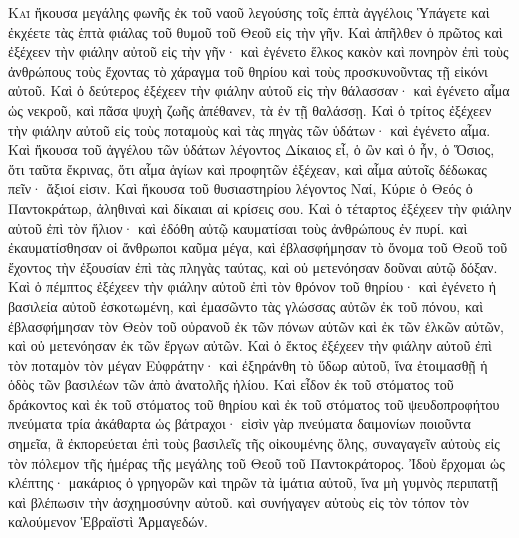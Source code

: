 \begin{pages}
    \begin{Rightside}
        \beginnumbering
		\renewcommand{\LettrineFontHook}{\PHtitl}
		\lettrine[lines=3]{Κ}{αὶ} ἤκουσα μεγάλης φωνῆς ἐκ τοῦ ναοῦ λεγούσης τοῖς ἑπτὰ ἀγγέλοις Ὑπάγετε καὶ ἐκχέετε τὰς ἑπτὰ φιάλας τοῦ θυμοῦ τοῦ Θεοῦ εἰς τὴν γῆν. Καὶ ἀπῆλθεν ὁ πρῶτος καὶ ἐξέχεεν τὴν φιάλην αὐτοῦ εἰς τὴν γῆν· καὶ ἐγένετο ἕλκος κακὸν καὶ πονηρὸν ἐπὶ τοὺς ἀνθρώπους τοὺς ἔχοντας τὸ χάραγμα τοῦ θηρίου καὶ τοὺς προσκυνοῦντας τῇ εἰκόνι αὐτοῦ. 
		\pend
		\pstart
		Καὶ ὁ δεύτερος ἐξέχεεν τὴν φιάλην αὐτοῦ εἰς τὴν θάλασσαν· καὶ ἐγένετο αἷμα ὡς νεκροῦ, καὶ πᾶσα ψυχὴ ζωῆς ἀπέθανεν, τὰ ἐν τῇ θαλάσσῃ. Καὶ ὁ τρίτος ἐξέχεεν τὴν φιάλην αὐτοῦ εἰς τοὺς ποταμοὺς καὶ τὰς πηγὰς τῶν ὑδάτων· καὶ ἐγένετο αἷμα. Καὶ ἤκουσα τοῦ ἀγγέλου τῶν ὑδάτων λέγοντος Δίκαιος εἶ, ὁ ὢν καὶ ὁ ἦν, ὁ Ὅσιος, ὅτι ταῦτα ἔκρινας, ὅτι αἷμα ἁγίων καὶ προφητῶν ἐξέχεαν, καὶ αἷμα αὐτοῖς δέδωκας πεῖν· ἄξιοί εἰσιν. 
		\pend
		\pstart
		Καὶ ἤκουσα τοῦ θυσιαστηρίου λέγοντος Ναί, Κύριε ὁ Θεός ὁ Παντοκράτωρ, ἀληθιναὶ καὶ δίκαιαι αἱ κρίσεις σου. Καὶ ὁ τέταρτος ἐξέχεεν τὴν φιάλην αὐτοῦ ἐπὶ τὸν ἥλιον· καὶ ἐδόθη αὐτῷ καυματίσαι τοὺς ἀνθρώπους ἐν πυρί. καὶ ἐκαυματίσθησαν οἱ ἄνθρωποι καῦμα μέγα, καὶ ἐβλασφήμησαν τὸ ὄνομα τοῦ Θεοῦ τοῦ ἔχοντος τὴν ἐξουσίαν ἐπὶ τὰς πληγὰς ταύτας, καὶ οὐ μετενόησαν δοῦναι αὐτῷ δόξαν. 
		\pend
		\pstart
		Καὶ ὁ πέμπτος ἐξέχεεν τὴν φιάλην αὐτοῦ ἐπὶ τὸν θρόνον τοῦ θηρίου· καὶ ἐγένετο ἡ βασιλεία αὐτοῦ ἐσκοτωμένη, καὶ ἐμασῶντο τὰς γλώσσας αὐτῶν ἐκ τοῦ πόνου, καὶ ἐβλασφήμησαν τὸν Θεὸν τοῦ οὐρανοῦ ἐκ τῶν πόνων αὐτῶν καὶ ἐκ τῶν ἑλκῶν αὐτῶν, καὶ οὐ μετενόησαν ἐκ τῶν ἔργων αὐτῶν. 
		\pend
		\pstart
		Καὶ ὁ ἕκτος ἐξέχεεν τὴν φιάλην αὐτοῦ ἐπὶ τὸν ποταμὸν τὸν μέγαν Εὐφράτην· καὶ ἐξηράνθη τὸ ὕδωρ αὐτοῦ, ἵνα ἑτοιμασθῇ ἡ ὁδὸς τῶν βασιλέων τῶν ἀπὸ ἀνατολῆς ἡλίου. Καὶ εἶδον ἐκ τοῦ στόματος τοῦ δράκοντος καὶ ἐκ τοῦ στόματος τοῦ θηρίου καὶ ἐκ τοῦ στόματος τοῦ ψευδοπροφήτου πνεύματα τρία ἀκάθαρτα ὡς βάτραχοι· εἰσὶν γὰρ πνεύματα δαιμονίων ποιοῦντα σημεῖα, ἃ ἐκπορεύεται ἐπὶ τοὺς βασιλεῖς τῆς οἰκουμένης ὅλης, συναγαγεῖν αὐτοὺς εἰς τὸν πόλεμον τῆς ἡμέρας τῆς μεγάλης τοῦ Θεοῦ τοῦ Παντοκράτορος. 
		\pend
		\pstart
		Ἰδοὺ ἔρχομαι ὡς κλέπτης· μακάριος ὁ γρηγορῶν καὶ τηρῶν τὰ ἱμάτια αὐτοῦ, ἵνα μὴ γυμνὸς περιπατῇ καὶ βλέπωσιν τὴν ἀσχημοσύνην αὐτοῦ. καὶ συνήγαγεν αὐτοὺς εἰς τὸν τόπον τὸν καλούμενον Ἑβραϊστὶ Ἁρμαγεδών. 

\end{Rightside}
\end{pages}
